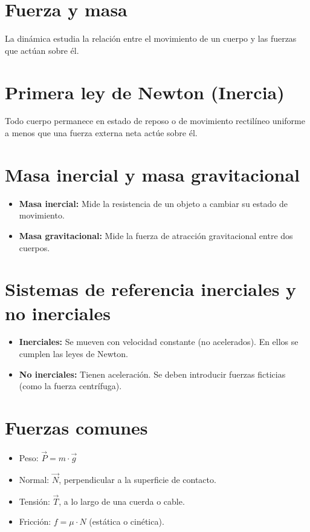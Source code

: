 \section{Fuerza y masa}

La dinámica estudia la relación entre el movimiento de un cuerpo y las fuerzas que actúan sobre él.

\section{Primera ley de Newton (Inercia)}
\label{sec:primera-ley}
Todo cuerpo permanece en estado de reposo o de movimiento rectilíneo uniforme a menos que una fuerza externa neta actúe sobre él.

\section{Masa inercial y masa gravitacional}
\begin{itemize}
    \item \textbf{Masa inercial:} Mide la resistencia de un objeto a cambiar su estado de movimiento.
    \item \textbf{Masa gravitacional:} Mide la fuerza de atracción gravitacional entre dos cuerpos.
\end{itemize}

\section{Sistemas de referencia inerciales y no inerciales}
\begin{itemize}
    \item \textbf{Inerciales:} Se mueven con velocidad constante (no acelerados). En ellos se cumplen las leyes de Newton.
    \item \textbf{No inerciales:} Tienen aceleración. Se deben introducir fuerzas ficticias (como la fuerza centrífuga).
\end{itemize}

\section{Fuerzas comunes}
\begin{itemize}
    \item Peso: \(\vec{P} = m \cdot \vec{g}\)
    \item Normal: \(\vec{N}\), perpendicular a la superficie de contacto.
    \item Tensión: \(\vec{T}\), a lo largo de una cuerda o cable.
    \item Fricción: \(f = \mu \cdot N\) (estática o cinética).
\end{itemize}